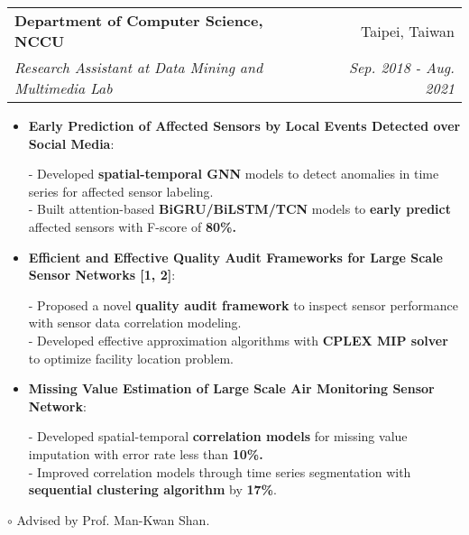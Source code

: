 \documentclass[letterpaper,11pt]{article}
\makeatletter
\newcommand{\resumeItem}[2]{
  \item\small{
    \textbf{#1}{: #2 \vspace{-2pt}}
  }
}
\newcommand{\resumeSubheading}[4]{
  \vspace{-2pt}\item
    \begin{tabular*}{0.97\textwidth}[t]{l@{\extracolsep{\fill}}r}
      \textbf{#1} & #2 \\
      \textit{\small #3} & \textit{\small #4} \\
    \end{tabular*}\vspace{-5pt}
}
\newcommand{\resumeItemListStart}{\begin{itemize}}
\newcommand{\resumeItemListEnd}{\end{itemize}\vspace{-5pt}}
\makeatother
\begin{document}
   \resumeSubheading
      {Department of Computer Science, NCCU}{Taipei, Taiwan}
      {Research Assistant at Data Mining and Multimedia Lab}{Sep. 2018 - Aug. 2021}
      \resumeItemListStart
        \resumeItem{Early Prediction of Affected Sensors by Local Events Detected over Social Media} \\
          {- Developed \textbf{spatial-temporal GNN} models to detect anomalies in time series for affected sensor labeling.} \\ 
          {- Built attention-based \textbf{BiGRU/BiLSTM/TCN} models to \textbf{early predict} affected sensors with F-score of \textbf{80\%.}} \\
        \resumeItem{Efficient and Effective Quality Audit Frameworks for Large Scale Sensor Networks [1, 2]} \\
          {- Proposed a novel \textbf{quality audit framework} to inspect sensor performance with sensor data correlation modeling.} \\
          {- Developed effective approximation algorithms with \textbf{CPLEX MIP solver} to optimize facility location problem.} \\
        \resumeItem{Missing Value Estimation of Large Scale Air Monitoring Sensor Network} \\
          {- Developed spatial-temporal \textbf{correlation models} for missing value imputation with error rate less than \textbf{10\%.}} \\
          {- Improved correlation models through time series segmentation with \textbf{sequential clustering algorithm} by \textbf{17\%}.}
      \resumeItemListEnd
      {$\circ$ Advised by Prof. Man-Kwan Shan.}
\end{document}

